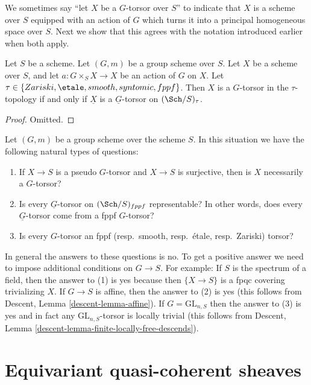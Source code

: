 \noindent
We sometimes say ``let $X$ be a $G$-torsor over $S$'' to indicate that
$X$ is a scheme over $S$ equipped with an action of $G$ which turns it
into a principal homogeneous space over $S$.
Next we show that this agrees with the notation introduced earlier
when both apply.

\begin{lemma}
\label{lemma-torsor}
Let $S$ be a scheme.
Let $(G, m)$ be a group scheme over $S$.
Let $X$ be a scheme over $S$, and let
$a : G \times_S X \to X$ be an action of $G$ on $X$.
Let $\tau \in \{Zariski, \etale, smooth, syntomic, fppf\}$.
Then $X$ is a $G$-torsor in the $\tau$-topology if and only if
$\underline{X}$ is a $\underline{G}$-torsor on $(\Sch/S)_\tau$.
\end{lemma}

\begin{proof}
Omitted.
\end{proof}

\begin{remark}
\label{remark-fun-with-torsors}
Let $(G, m)$ be a group scheme over the scheme $S$.
In this situation we have the following natural types of questions:
\begin{enumerate}
\item If $X \to S$ is a pseudo $G$-torsor and $X \to S$ is surjective,
then is $X$ necessarily a $G$-torsor?
\item Is every $\underline{G}$-torsor on $(\Sch/S)_{fppf}$
representable? In other words, does every $\underline{G}$-torsor
come from a fppf $G$-torsor?
\item Is every $G$-torsor an
fppf (resp.\ smooth, resp.\ \'etale, resp.\ Zariski) torsor?
\end{enumerate}
In general the answers to these questions is no. To get a positive answer
we need to impose additional conditions on $G \to S$.
For example:
If $S$ is the spectrum of a field, then the answer to (1) is yes
because then $\{X \to S\}$ is a fpqc covering trivializing $X$.
If $G \to S$ is affine, then the answer to (2) is yes
(this follows from Descent, Lemma \ref{descent-lemma-affine}).
If $G = \text{GL}_{n, S}$ then the answer to (3) is yes
and in fact any $\text{GL}_{n, S}$-torsor is locally trivial
(this follows from
Descent, Lemma \ref{descent-lemma-finite-locally-free-descends}).
\end{remark}



\section{Equivariant quasi-coherent sheaves}
\label{section-equivariant}

